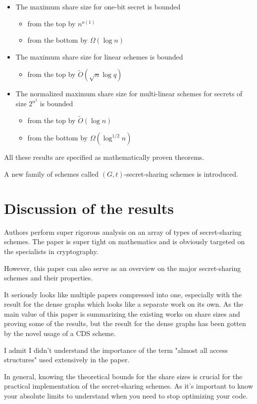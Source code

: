\begin{itemize}
    \item The maximum share size for one-bit secret is bounded 
    \begin{itemize}
        \item from the top by $n^{o(1)}$
        \item from the bottom by $\Omega(\log n)$
    \end{itemize}
    \item The maximum share size for linear schemes is bounded
    \begin{itemize}
        \item from the top by $\tilde{O}(\sqrt{n} \log q)$
    \end{itemize}
    \item The normalized maximum share size for multi-linear schemes for secrets of size $2^{n^2}$ is bounded
    \begin{itemize}
        \item from the top by $\tilde{O}(\log n)$
        \item from the bottom by $\Omega(\log^{1/2} n)$
    \end{itemize}
\end{itemize}

All these results are specified as mathematically proven theorems.

A new family of schemes called $(G, t)$-secret-sharing schemes is introduced.

\section{Discussion of the results}

Authors perform super rigorous analysis on an array of types of secret-sharing schemes.
The paper is super tight on mathematics and is obviously targeted on the specialists in cryptography.

However, this paper can also serve as an overview on the major secret-sharing schemes and their properties.

It seriously looks like multiple papers compressed into one, especially with the result for the dense graphs which looks like a separate work on its own.
As the main value of this paper is summarizing the existing works on share sizes and proving some of the results,
but the result for the dense graphs has been gotten by the novel usage of a CDS scheme.

I admit I didn't understand the importance of the term "almost all access structures" used extensively in the paper.

In general, knowing the theoretical bounds for the share sizes is crucial for the practical implementation of the secret-sharing schemes.
As it's important to know your absolute limits to understand when you need to stop optimizing your code.

